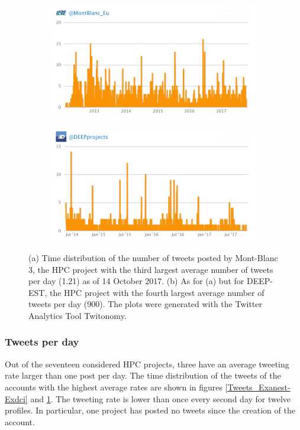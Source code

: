 \begin{figure}
 \centering
 \begin{subfigure}[t]{0.9\textwidth}
   \includegraphics[width=1\linewidth]{Images/Tweets_Montblanc.png}
   \caption{} 
 \end{subfigure}

 \begin{subfigure}[t]{0.9\textwidth}
   \includegraphics[width=1\linewidth]{Images/Tweets_Deepest.png}
   \caption{}
 \end{subfigure}
 \caption{(a) Time distribution of the number of tweets posted by Mont-Blanc 3, the HPC project with the third largest average number of tweets per day (1.21) as of 14 October 2017. (b) As for (a) but for DEEP-EST, the HPC project with the fourth largest average number of tweets per day (900). The plots were generated with the Twitter Analytics Tool Twitonomy.} 
 \label{Tweets_Montblanc-Deepest}
\end{figure}

\subsubsection{Tweets per day}
Out of the seventeen considered HPC projects, three have an average tweeting rate larger than one post per day. The time distribution of the tweets of the accounts with the highest average rates are shown in figures \ref{Tweets_Exanest-Exdci} and \ref{Tweets_Montblanc-Deepest}. The tweeting rate is lower than once every second day for twelve profiles. In particular, one project has posted no tweets since the creation of the account. 


